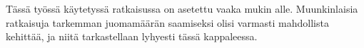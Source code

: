 Tässä työssä käytetyssä ratkaisussa on asetettu vaaka mukin alle. Muunkinlaisia ratkaisuja tarkemman juomamäärän saamiseksi olisi varmasti mahdollista kehittää, ja niitä tarkastellaan lyhyesti tässä kappaleessa.
